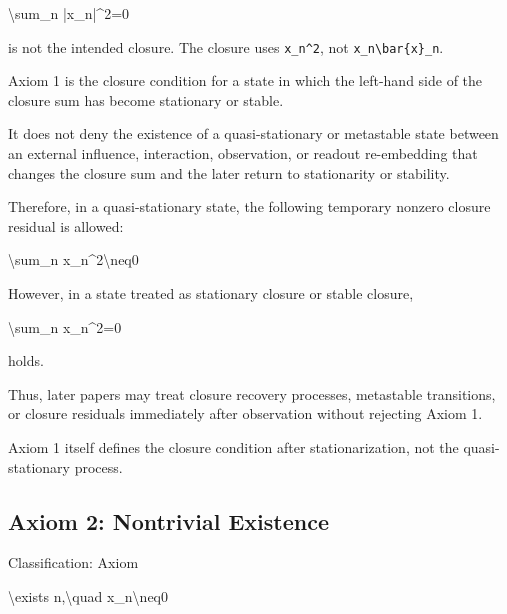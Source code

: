 \documentclass[
  a4paper]{article}
\newenvironment{Shaded}{}{}
\newcommand{\NormalTok}[1]{#1}
\begin{document}
\begin{Shaded}
\begin{Highlighting}[]
\NormalTok{\textbackslash{}sum\_n |x\_n|\^{}2=0}
\end{Highlighting}
\end{Shaded}

is not the intended closure. The closure uses \texttt{x\_n\^{}2}, not
\texttt{x\_n\textbackslash{}bar\{x\}\_n}.

Axiom 1 is the closure condition for a state in which the left-hand side
of the closure sum has become stationary or stable.

It does not deny the existence of a quasi-stationary or metastable state
between an external influence, interaction, observation, or readout
re-embedding that changes the closure sum and the later return to
stationarity or stability.

Therefore, in a quasi-stationary state, the following temporary nonzero
closure residual is allowed:

\begin{Shaded}
\begin{Highlighting}[]
\NormalTok{\textbackslash{}sum\_n x\_n\^{}2\textbackslash{}neq0}
\end{Highlighting}
\end{Shaded}

However, in a state treated as stationary closure or stable closure,

\begin{Shaded}
\begin{Highlighting}[]
\NormalTok{\textbackslash{}sum\_n x\_n\^{}2=0}
\end{Highlighting}
\end{Shaded}

holds.

Thus, later papers may treat closure recovery processes, metastable
transitions, or closure residuals immediately after observation without
rejecting Axiom 1.

Axiom 1 itself defines the closure condition after stationarization, not
the quasi-stationary process.

\subsection{Axiom 2: Nontrivial
Existence}\label{axiom-2-nontrivial-existence}

Classification: Axiom

\begin{Shaded}
\begin{Highlighting}[]
\NormalTok{\textbackslash{}exists n,\textbackslash{}quad x\_n\textbackslash{}neq0}
\end{Highlighting}
\end{Shaded}
\end{document}
